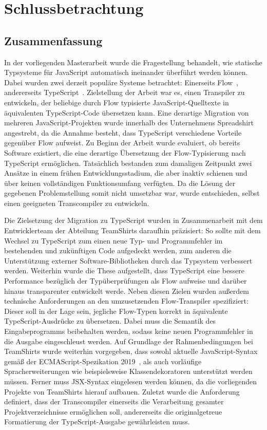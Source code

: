 \chapter{Schlussbetrachtung}
\label{chap:conclusion}

\section{Zusammenfassung}

In der vorliegenden Masterarbeit wurde die Fragestellung behandelt, wie statische Typsysteme für JavaScript automatisch ineinander überführt werden können. Dabei wurden zwei derzeit populäre Systeme betrachtet: Einerseits Flow~\autocite{FLOW:PAPER}, andererseits TypeScript~\autocite{TYPESCRIPT:SPEC}. Zielstellung der Arbeit war es, einen Transpiler zu entwickeln, der beliebige durch Flow typisierte JavaScript-Quelltexte in äquivalenten TypeScript-Code übersetzen kann. Eine derartige Migration von mehreren JavaScript-Projekten wurde innerhalb des Unternehmens Spreadshirt angestrebt, da die Annahme besteht, dass TypeScript verschiedene Vorteile gegenüber Flow aufweist. Zu Beginn der Arbeit wurde evaluiert, ob bereits Software existiert, die eine derartige Übersetzung der Flow-Typisierung nach TypeScript ermöglichen. Tatsächlich bestanden zum damaligen Zeitpunkt zwei Ansätze in einem frühen Entwicklungsstadium, die aber inaktiv schienen und über keinen vollständigen Funktionsumfang verfügten. Da die Lösung der gegebenen Problemstellung somit nicht umsetzbar war, wurde entschieden, selbst einen geeigneten Transcompiler zu entwickeln.

Die Zielsetzung der Migration zu TypeScript wurden in Zusammenarbeit mit dem Entwicklerteam der Abteilung TeamShirts daraufhin präzisiert: So sollte mit dem Wechsel zu TypeScript zum einen neue Typ- und Programmfehler im bestehenden und zukünftigen Code aufgedeckt werden, zum anderen die Unterstützung externer Software-Bibliotheken durch das Typsystem verbessert werden. Weiterhin wurde die These aufgestellt, dass TypeScript eine bessere Performance bezüglich der Typüberprüfungen als Flow aufweise und darüber hinaus transparenter entwickelt werde. Neben diesen Zielen wurden außerdem technische Anforderungen an den umzusetzenden Flow-Transpiler spezifiziert: Dieser soll in der Lage sein, jegliche Flow-Typen korrekt in äquivalente TypeScript-Ausdrücke zu übersetzen. Dabei muss die Semantik des Eingabeprogramms beibehalten werden, sodass keine neuen Programmfehler in die Ausgabe eingeschleust werden. Auf Grundlage der Rahmenbedingungen bei TeamShirts wurde weiterhin vorgegeben, dass sowohl aktuelle JavaScript-Syntax gemäß der ECMAScript-Spezikation 2019~\autocite{ECMASCRIPT:2019}, als auch vorläufige Spracherweiterungen wie beispielsweise Klassendekoratoren unterstützt werden müssen. Ferner muss JSX-Syntax eingelesen werden können, da die vorliegenden Projekte von TeamShirts hierauf aufbauen. Zuletzt wurde die Anforderung definiert, dass der Transcompiler einerseits die Verarbeitung gesamter Projektverzeichnisse ermöglichen soll, andererseits die originalgetreue Formatierung der TypeScript-Ausgabe gewährleisten muss.

